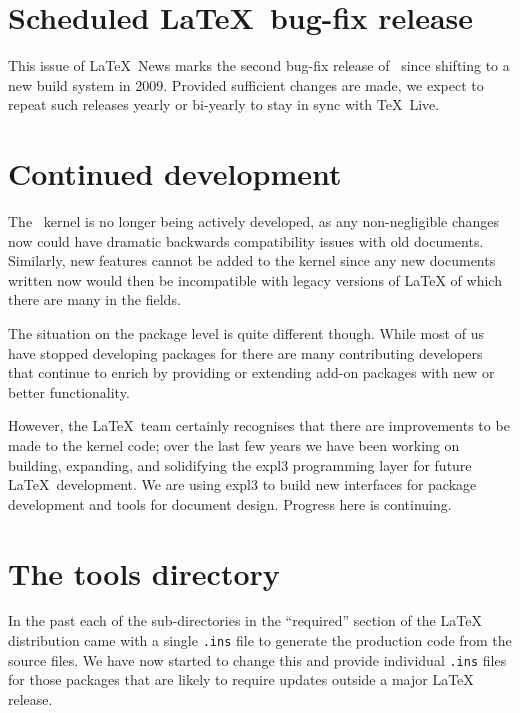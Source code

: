 \documentclass{ltnews}
\begin{document}
\maketitle

\section{Scheduled \LaTeX\ bug-fix release}

This issue of \LaTeX~News marks the second bug-fix release of
\LaTeXe\ since shifting to a new build system in 2009.
Provided sufficient changes are made, we expect to
repeat such releases yearly or bi-yearly to stay in sync with \TeX\ Live.

\section{Continued development}

\begin{itshape} %

The \LaTeXe\ kernel is no longer being actively developed, as any non-negligible changes now could have dramatic backwards compatibility issues with old documents. Similarly, new features cannot be added to the kernel since any new documents written now would then be incompatible with legacy versions of \LaTeX{} of which there are many in the fields.

The situation on the package level is quite different though. While most of us have stopped developing packages for \LaTeXe{} there are many contributing developers that continue to enrich \LaTeXe{} by providing or extending add-on packages with new or better functionality.

However, the \LaTeX\ team certainly recognises that there are improvements to be made to the kernel code; over the last few years we have been working on building, expanding, and solidifying the \textsf{expl3} programming layer for future \LaTeX\ development. We are using \textsf{expl3} to build new interfaces for package development and tools for document design. Progress here is continuing.

\end{itshape}


\section{The tools directory}

In the past each of the sub-directories in the ``required'' section of
the \LaTeX{} distribution came with a single \texttt{.ins} file to
generate the production code from the source files. We have now
started to change this and provide individual \texttt{.ins} files for
those packages that are likely to require updates outside a major
\LaTeX{} release.
\end{document}
